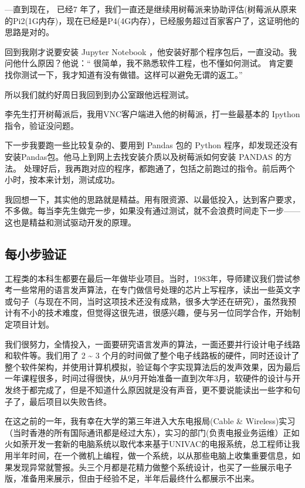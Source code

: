 ---直到现在， 已经7
年了，我们一直还是继续用树莓派来协助评估(树莓派从原来的Pi2(1G内存)，现在已经是P4(4G内存），已经服务超过百家客户了，这证明他的思路是对的。

回到我刚才说要安装 Jupyter Notebook
，他安装好那个程序包后，一直没动。我问他什么原因？他说：``
很简单，我不熟悉软件工程，也不懂如何测试。
肯定要找你测试一下，我才知道有没有做错。这样可以避免无谓的返工。''

所以我们就约好周日我回到到办公室跟他远程测试。

李先生打开树莓派后，我用VNC客户端进入他的树莓派，打一些最基本的 Ipython
指令，验证没问题。

下一步我要跑一些比较复杂的、要用到 Pandas 包的 Python
程序，却发现还没有安装Pandas包。他马上到网上去找安装介质以及树莓派如何安装
PANDAS 的方法。
处理好后，我再跑对应的程序，都跑通了，包括之前跑过的指令。前后两个小时，按本来计划，测试成功。

我回想一下，其实他的思路就是精益。用有限资源、以最低投入，达到客户要求，不多做。每当李先生做完一步，如果没有通过测试，就不会浪费时间走下一步------这也是精益和测试驱动开发的原理。

\hypertarget{ux6bcfux5c0fux6b65ux9a8cux8bc1}{%
\subsection{每小步验证}\label{ux6bcfux5c0fux6b65ux9a8cux8bc1}}

工程类的本科生都要在最后一年做毕业项目。当时，1983年，导师建议我们尝试参考一些常用的语言发声算法，在专门做信号处理的芯片上写程序，读出一些英文字或句子（与现在不同，当时这项技术还没有成熟，很多大学还在研究），虽然我预计有不小的技术难度，但觉得这很先进，很感兴趣，便与另一位同学合作，开始制定项目计划。

我们很努力，全情投入，一面要研究语言发声的算法，一面还要并行设计电子线路和软件等。我们用了
2 \textasciitilde{} 3
个月的时间做了整个电子线路板的硬件，同时还设计了整个软件架构，并使用计算机模拟，验证每个字实现算法后的发声效果，因为最后一年课程很多，时间过得很快，从9月开始准备一直到次年3月，软硬件的设计与开发终于都完成了，但是不知道什么原因就是没有声音，更不要说能读出一些字和句子了，最后项目以失败告终。

在这之前的一年，我有幸在大学的第三年进入大东电报局(Cable \&
Wireless)实习（当时香港的所有国际通讯都是经过大东），实习的部门(负责电报业务运维）正如火如荼开发一套新的电脑系统以取代本来基于UNIVAC的电报系统，总工程师让我用半年时间，在一个微机上编程，做一个系统，以从那些电脑上收集重要信息，如果发现异常就警报。头三个月都是花精力做整个系统设计，也买了一些展示电子版，准备用来展示，但由于经验不足，半年后最终什么都展示不出来。

